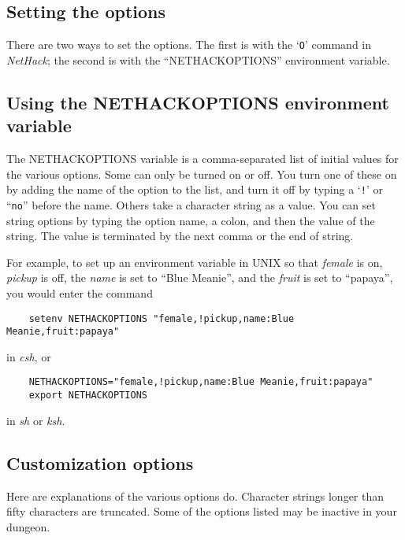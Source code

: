 \subsection*{Setting the options}

There are two ways to set the options.  The first is with the `{\tt O}'
command in {\it NetHack}; the second is with the ``NETHACKOPTIONS''
environment variable.

\subsection*{Using the NETHACKOPTIONS environment variable}

The NETHACKOPTIONS variable is a comma-separated list of initial
values for the various options.  Some can only be turned on or off.
You turn one of these on by adding the name of the option to the list,
and turn it off by typing a `{\tt !}' or ``{\tt no}'' before the name.
Others take a
character string as a value.  You can set string options by typing
the option name, a colon, and then the value of the string.  The value
is terminated by the next comma or the end of string.

For example, to set up an environment variable in UNIX so that {\it female\/}
is on, {\it pickup\/} is off, the {\it name\/} is set to ``Blue Meanie'', and
the {\it fruit\/} is set to ``papaya'', you would enter the command
\begin{verbatim}
    setenv NETHACKOPTIONS "female,!pickup,name:Blue Meanie,fruit:papaya"
\end{verbatim}

\nd in {\it csh}, or
\begin{verbatim}
    NETHACKOPTIONS="female,!pickup,name:Blue Meanie,fruit:papaya"
    export NETHACKOPTIONS
\end{verbatim}

\nd in {\it sh\/} or {\it ksh}.

\subsection*{Customization options}

Here are explanations of the various options do.  Character strings
longer than fifty characters are truncated.  Some of the options
listed may be inactive in your dungeon.

